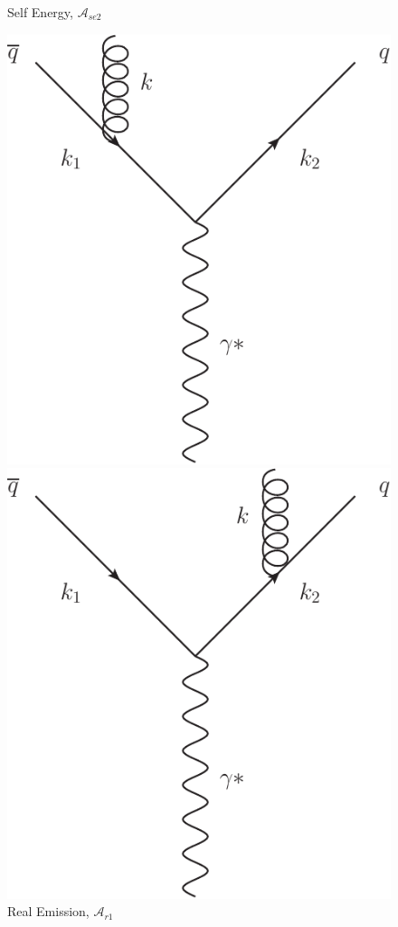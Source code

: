 \begin{figure}[tpb]
\begin{minipage}{0.4\linewidth}
				\caption{Self Energy, $\mathcal{A}_{se2}$}
			\end{minipage}
			\begin{minipage}{0.4\linewidth}
				\centering
				\includegraphics[width=0.98\linewidth]{NLORealLeft}
				\caption{Real Emission, $\mathcal{A}_{r1}$}
			\end{minipage}
			\begin{minipage}{0.4\linewidth}
				\centering
				\includegraphics[width=0.98\linewidth]{NLORealRight}

\end{minipage}
\end{figure}
